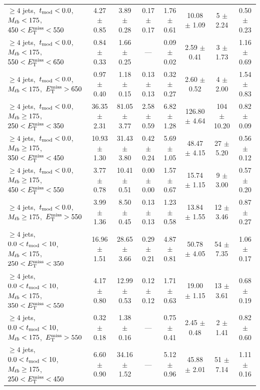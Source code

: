 \begin{table}
\begin{tabular}{|l|c c c c c|c|c|}
$\ge4$ jets,~$t_\text{mod} <0.0$,~$M_{\ell b}<175$,~$450<E_\text{T}^\text{miss}<550$       & 4.27 $\pm$ 0.85  & 3.89 $\pm$ 0.28   & 0.17 $\pm$ 0.17 & 1.76 $\pm$ 0.61  & 10.08 $\pm$ 1.09  & 5 $\pm$ 2.24    & 0.50 $\pm$ 0.23 \\
$\ge4$ jets,~$t_\text{mod} <0.0$,~$M_{\ell b}<175$,~$550<E_\text{T}^\text{miss}<650$       & 0.84 $\pm$ 0.33  & 1.66 $\pm$ 0.25   &       ---       & 0.09 $\pm$ 0.02  & 2.59 $\pm$ 0.41   & 3 $\pm$ 1.73    & 1.16 $\pm$ 0.69 \\
$\ge4$ jets,~$t_\text{mod} <0.0$,~$M_{\ell b}<175$,~$E_\text{T}^\text{miss}>650$           & 0.97 $\pm$ 0.40  & 1.18 $\pm$ 0.15   & 0.13 $\pm$ 0.13 & 0.32 $\pm$ 0.27  & 2.60 $\pm$ 0.52   & 4 $\pm$ 2.00    & 1.54 $\pm$ 0.83 \\
\hline
$\ge4$ jets,~$t_\text{mod} <0.0$,~$M_{\ell b}\ge175$,~$250<E_\text{T}^\text{miss}<350$     & 36.35 $\pm$ 2.31 & 81.05 $\pm$ 3.77  & 2.58 $\pm$ 0.59 & 6.82 $\pm$ 1.28  & 126.80 $\pm$ 4.64 & 104 $\pm$ 10.20 & 0.82 $\pm$ 0.09 \\
$\ge4$ jets,~$t_\text{mod} <0.0$,~$M_{\ell b}\ge175$,~$350<E_\text{T}^\text{miss}<450$     & 10.93 $\pm$ 1.30 & 31.43 $\pm$ 3.80  & 0.42 $\pm$ 0.24 & 5.69 $\pm$ 1.05  & 48.47 $\pm$ 4.15  & 27 $\pm$ 5.20   & 0.56 $\pm$ 0.12 \\
$\ge4$ jets,~$t_\text{mod} <0.0$,~$M_{\ell b}\ge175$,~$450<E_\text{T}^\text{miss}<550$     & 3.77 $\pm$ 0.78  & 10.41 $\pm$ 0.51  & 0.00 $\pm$ 0.00 & 1.57 $\pm$ 0.67  & 15.74 $\pm$ 1.15  & 9 $\pm$ 3.00    & 0.57 $\pm$ 0.20 \\
$\ge4$ jets,~$t_\text{mod} <0.0$,~$M_{\ell b}\ge175$,~$E_\text{T}^\text{miss}>550$         & 3.99 $\pm$ 1.36  & 8.50 $\pm$ 0.45   & 0.13 $\pm$ 0.13 & 1.23 $\pm$ 0.58  & 13.84 $\pm$ 1.55  & 12 $\pm$ 3.46   & 0.87 $\pm$ 0.27 \\
\hline
$\ge4$ jets,~$0.0< t_\text{mod} <10$,~$M_{\ell b}<175$,~$250<E_\text{T}^\text{miss}<350$  & 16.96 $\pm$ 1.51 & 28.65 $\pm$ 3.66  & 0.29 $\pm$ 0.21 & 4.87 $\pm$ 0.81  & 50.78 $\pm$ 4.05  & 54 $\pm$ 7.35   & 1.06 $\pm$ 0.17 \\
$\ge4$ jets,~$0.0< t_\text{mod} <10$,~$M_{\ell b}<175$,~$350<E_\text{T}^\text{miss}<550$  & 4.17 $\pm$ 0.80  & 12.99 $\pm$ 0.53  & 0.12 $\pm$ 0.12 & 1.71 $\pm$ 0.63  & 19.00 $\pm$ 1.15  & 13 $\pm$ 3.61   & 0.68 $\pm$ 0.19 \\
$\ge4$ jets,~$0.0< t_\text{mod} <10$,~$M_{\ell b}<175$,~$E_\text{T}^\text{miss}>550$      & 0.32 $\pm$ 0.18  & 1.38 $\pm$ 0.16   &       ---       & 0.75 $\pm$ 0.41  & 2.45 $\pm$ 0.48   & 2 $\pm$ 1.41    & 0.82 $\pm$ 0.60 \\
\hline
$\ge4$ jets,~$0.0< t_\text{mod} <10$,~$M_{\ell b}\ge175$,~$250<E_\text{T}^\text{miss}<450$& 6.60 $\pm$ 0.90  & 34.16 $\pm$ 1.52  &       ---       & 5.12 $\pm$ 0.96  & 45.88 $\pm$ 2.01  & 51 $\pm$ 7.14   & 1.11 $\pm$ 0.16 \\

\end{tabular}
\end{table}
